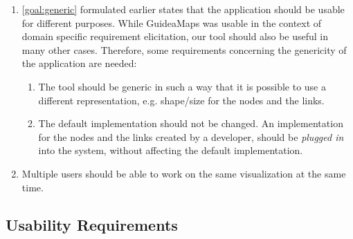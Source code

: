 \begin{enumerate}[label=\textbf{FR \arabic*}., labelindent=0.5cm, ref=FR \arabic*, leftmargin=*]
	\item \label{fr:genericity}
		\ref{goal:generic} formulated earlier states that the application should be usable for different purposes. While GuideaMaps was usable in the context of domain specific requirement elicitation, our tool should also be useful in many other cases. Therefore, some requirements concerning the genericity of the application are needed:
  	\begin{enumerate}
		\item The tool should be generic in such a way that it is possible to use a different representation, e.g. shape/size for the nodes and the links.
		\item The default implementation should not be changed. An implementation for the nodes and the links created by a developer, should be \textit{plugged in} into the system, without affecting the default implementation.
	\end{enumerate}
	
	\item \label{fr:work-simultaneously}
		Multiple users should be able to work on the same visualization at the same time.
  
\end{enumerate}



\subsection{Usability Requirements}\label{sec:usability-requirements}

